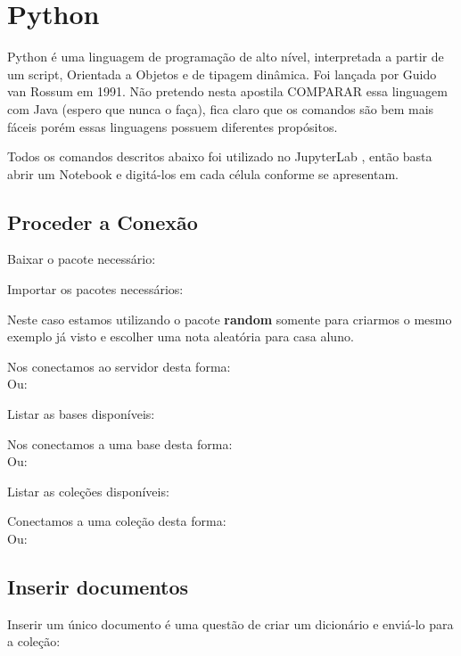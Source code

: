 \section{Python}
Python é uma linguagem de programação de alto nível, interpretada a partir de um script, Orientada a Objetos e de tipagem dinâmica. Foi lançada por Guido van Rossum em 1991. Não pretendo nesta apostila COMPARAR essa linguagem com Java (espero que nunca o faça), fica claro que os comandos são bem mais fáceis porém essas linguagens possuem diferentes propósitos.

Todos os comandos descritos abaixo foi utilizado no JupyterLab \cite{jupyteroficial}, então basta abrir um Notebook e digitá-los em cada célula conforme se apresentam.

\subsection{Proceder a Conexão}
Baixar o pacote necessário: \\

Importar os pacotes necessários: \\

Neste caso estamos utilizando o pacote \textbf{random} somente para criarmos o mesmo exemplo já visto e escolher uma nota aleatória para casa aluno.

Nos conectamos ao servidor desta forma: \\
Ou: \\

Listar as bases disponíveis: \\

Nos conectamos a uma base desta forma: \\
Ou: \\

Listar as coleções disponíveis: \\

Conectamos a uma coleção desta forma: \\
Ou: \\

\subsection{Inserir documentos}
Inserir um único documento é uma questão de criar um dicionário e enviá-lo para a coleção: \\

